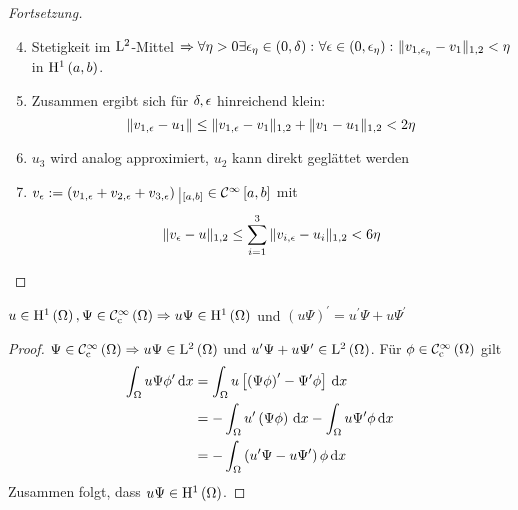 \begin{proof}[Fortsetzung]
	\begin{enumerate}
		\setcounter{enumi}{3}
		\item Stetigkeit im $\mathrm{L}^{2}$-Mittel $\Rightarrow \forall\eta>0\exists\epsilon_{\eta}\in\left(0,\delta\right)\colon\forall\epsilon\in\left(0,\epsilon_{\eta}\right)\colon\|v_{1,\epsilon_{\eta}}-v_{1}\|_{1,2} < \eta$ in $\mathrm{H}^{1}\left(a,b\right)$.{}
		\item Zusammen ergibt sich für $\delta,\epsilon$ hinreichend klein:
			\begin{equation*}
				\|v_{1,\epsilon}-u_{1}\| \leq \|v_{1,\epsilon}-v_{1}\|_{1,2}+\|v_{1}-u_{1}\|_{1,2}<2\eta
			\end{equation*}
		\item  $u_{3}$ wird analog approximiert, $u_{2}$ kann direkt geglättet werden
		\item $v_{\e} := \left(v_{1,\e}+v_{2,\e}+v_{3,\e}\right)\einschraenkung_{\left[a,b\right]}\in\C^{\infty}\left[a,b\right]$ mit
			\begin{equation*}
				\|v_{\epsilon}-u\|_{1,2} \leq \sum_{i=1}^{3}\|v_{i,\epsilon}-u_{i}\|_{1,2} < 6\eta
			\end{equation*}
	\end{enumerate}
\end{proof}

\begin{lemma}[Produktregel]
	$u\in\mathrm{H}^{1}\left(\Omega\right),\Psi\in\mathcal{C}^{\infty}_{\text{c}}\left(\Omega\right) \Rightarrow u\Psi\in\mathrm{H}^{1}\left(\Omega\right)$ und $\left(u\Psi\right)^{\prime}=u^{\prime}\Psi+u\Psi^{\prime}$
\end{lemma}
\begin{proof}
	$\Psi\in\mathcal{C}^{\infty}_{\text{c}}\left(\Omega\right)\Rightarrow u\Psi\in\mathrm{L}^{2}\left(\Omega\right)$ und $u^{\prime}\Psi+u\Psi^{\prime}\in\mathrm{L}^{2}\left(\Omega\right)$. Für $\phi\in\mathcal{C}^{\infty}_{\text{c}}\left(\Omega\right)$ gilt
	\begin{align*}
		\int_{\Omega}u\Psi\phi^{\prime}\,\mathrm{d} x &= \int_{\Omega}u\left[\left(\Psi\phi\right)^{\prime}-\Psi^{\prime}\phi\right]\,\mathrm{d} x\\
			&= -\int_{\Omega}u^{\prime}\left(\Psi\phi\right)\,\mathrm{d} x - \int_{\Omega}u\Psi^{\prime}\phi\,\mathrm{d} x\\
			&= -\int_{\Omega}\left(u^{\prime}\Psi-u\Psi^{\prime}\right)\phi\,\mathrm{d} x
	\end{align*}
	Zusammen folgt, dass $u\Psi\in\mathrm{H}^{1}\left(\Omega\right)$.
\end{proof}

